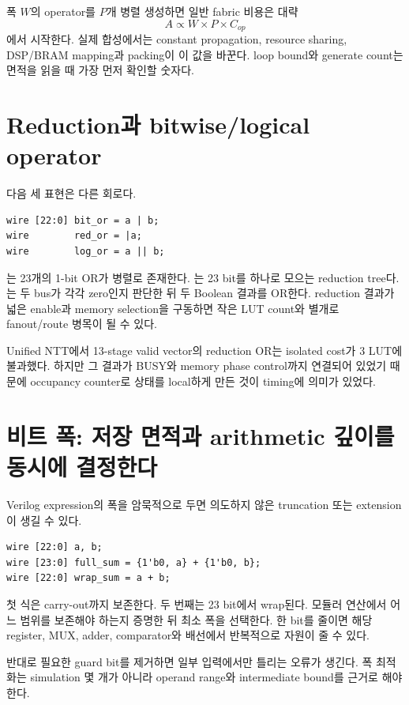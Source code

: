 \begin{summarybox}
폭 $W$의 operator를 $P$개 병렬 생성하면 일반 fabric 비용은 대략
\[
  A \propto W\times P\times C_{op}
\]
에서 시작한다. 실제 합성에서는 constant propagation, resource sharing, DSP/BRAM
mapping과 packing이 이 값을 바꾼다. loop bound와 generate count는 면적을 읽을 때
가장 먼저 확인할 숫자다.
\end{summarybox}

\section{Reduction과 bitwise/logical operator}

다음 세 표현은 다른 회로다.

\begin{lstlisting}
wire [22:0] bit_or = a | b;
wire        red_or = |a;
wire        log_or = a || b;
\end{lstlisting}

는 23개의 1-bit OR가 병렬로 존재한다. 는 23 bit를
하나로 모으는 reduction tree다. 는 두 bus가 각각 zero인지 판단한
뒤 두 Boolean 결과를 OR한다. reduction 결과가 넓은 enable과 memory selection을
구동하면 작은 LUT count와 별개로 fanout/route 병목이 될 수 있다.

Unified NTT에서 13-stage valid vector의 reduction OR는 isolated cost가 3 LUT에
불과했다. 하지만 그 결과가 BUSY와 memory phase control까지 연결되어 있었기
때문에 occupancy counter로 상태를 local하게 만든 것이 timing에 의미가 있었다.

\section{비트 폭: 저장 면적과 arithmetic 깊이를 동시에 결정한다}

Verilog expression의 폭을 암묵적으로 두면 의도하지 않은 truncation 또는
extension이 생길 수 있다.

\begin{lstlisting}
wire [22:0] a, b;
wire [23:0] full_sum = {1'b0, a} + {1'b0, b};
wire [22:0] wrap_sum = a + b;
\end{lstlisting}

첫 식은 carry-out까지 보존한다. 두 번째는 23 bit에서 wrap된다. 모듈러 연산에서
어느 범위를 보존해야 하는지 증명한 뒤 최소 폭을 선택한다. 한 bit를 줄이면 해당
register, MUX, adder, comparator와 배선에서 반복적으로 자원이 줄 수 있다.

반대로 필요한 guard bit를 제거하면 일부 입력에서만 틀리는 오류가 생긴다. 폭
최적화는 simulation 몇 개가 아니라 operand range와 intermediate bound를 근거로
해야 한다.

